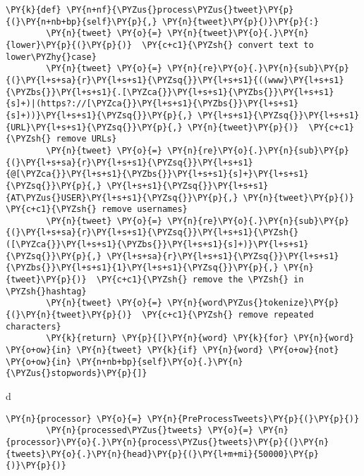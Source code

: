 \begin{tcolorbox}[breakable, size=fbox, boxrule=1pt, pad at break*=1mm,colback=cellbackground, colframe=cellborder]
\begin{Verbatim}[commandchars=\\\{\}]
        \PY{k}{def} \PY{n+nf}{\PYZus{}process\PYZus{}tweet}\PY{p}{(}\PY{n+nb+bp}{self}\PY{p}{,} \PY{n}{tweet}\PY{p}{)}\PY{p}{:}
        \PY{n}{tweet} \PY{o}{=} \PY{n}{tweet}\PY{o}{.}\PY{n}{lower}\PY{p}{(}\PY{p}{)}  \PY{c+c1}{\PYZsh{} convert text to lower\PYZhy{}case}
        \PY{n}{tweet} \PY{o}{=} \PY{n}{re}\PY{o}{.}\PY{n}{sub}\PY{p}{(}\PY{l+s+sa}{r}\PY{l+s+s1}{\PYZsq{}}\PY{l+s+s1}{((www}\PY{l+s+s1}{\PYZbs{}}\PY{l+s+s1}{.[\PYZca{}}\PY{l+s+s1}{\PYZbs{}}\PY{l+s+s1}{s]+)|(https?://[\PYZca{}}\PY{l+s+s1}{\PYZbs{}}\PY{l+s+s1}{s]+))}\PY{l+s+s1}{\PYZsq{}}\PY{p}{,} \PY{l+s+s1}{\PYZsq{}}\PY{l+s+s1}{URL}\PY{l+s+s1}{\PYZsq{}}\PY{p}{,} \PY{n}{tweet}\PY{p}{)}  \PY{c+c1}{\PYZsh{} remove URLs}
        \PY{n}{tweet} \PY{o}{=} \PY{n}{re}\PY{o}{.}\PY{n}{sub}\PY{p}{(}\PY{l+s+sa}{r}\PY{l+s+s1}{\PYZsq{}}\PY{l+s+s1}{@[\PYZca{}}\PY{l+s+s1}{\PYZbs{}}\PY{l+s+s1}{s]+}\PY{l+s+s1}{\PYZsq{}}\PY{p}{,} \PY{l+s+s1}{\PYZsq{}}\PY{l+s+s1}{AT\PYZus{}USER}\PY{l+s+s1}{\PYZsq{}}\PY{p}{,} \PY{n}{tweet}\PY{p}{)}  \PY{c+c1}{\PYZsh{} remove usernames}
        \PY{n}{tweet} \PY{o}{=} \PY{n}{re}\PY{o}{.}\PY{n}{sub}\PY{p}{(}\PY{l+s+sa}{r}\PY{l+s+s1}{\PYZsq{}}\PY{l+s+s1}{\PYZsh{}([\PYZca{}}\PY{l+s+s1}{\PYZbs{}}\PY{l+s+s1}{s]+)}\PY{l+s+s1}{\PYZsq{}}\PY{p}{,} \PY{l+s+sa}{r}\PY{l+s+s1}{\PYZsq{}}\PY{l+s+s1}{\PYZbs{}}\PY{l+s+s1}{1}\PY{l+s+s1}{\PYZsq{}}\PY{p}{,} \PY{n}{tweet}\PY{p}{)}  \PY{c+c1}{\PYZsh{} remove the \PYZsh{} in \PYZsh{}hashtag}
        \PY{n}{tweet} \PY{o}{=} \PY{n}{word\PYZus{}tokenize}\PY{p}{(}\PY{n}{tweet}\PY{p}{)}  \PY{c+c1}{\PYZsh{} remove repeated characters}
        \PY{k}{return} \PY{p}{[}\PY{n}{word} \PY{k}{for} \PY{n}{word} \PY{o+ow}{in} \PY{n}{tweet} \PY{k}{if} \PY{n}{word} \PY{o+ow}{not} \PY{o+ow}{in} \PY{n+nb+bp}{self}\PY{o}{.}\PY{n}{\PYZus{}stopwords}\PY{p}{]}
    \end{Verbatim}
\end{tcolorbox}
d
\begin{tcolorbox}[breakable, size=fbox, boxrule=1pt, pad at break*=1mm,colback=cellbackground, colframe=cellborder]
    \begin{Verbatim}[commandchars=\\\{\}]
        \PY{n}{processor} \PY{o}{=} \PY{n}{PreProcessTweets}\PY{p}{(}\PY{p}{)}
        \PY{n}{processed\PYZus{}tweets} \PY{o}{=} \PY{n}{processor}\PY{o}{.}\PY{n}{process\PYZus{}tweets}\PY{p}{(}\PY{n}{tweets}\PY{o}{.}\PY{n}{head}\PY{p}{(}\PY{l+m+mi}{50000}\PY{p}{)}\PY{p}{)}
    \end{Verbatim}
\end{tcolorbox}

